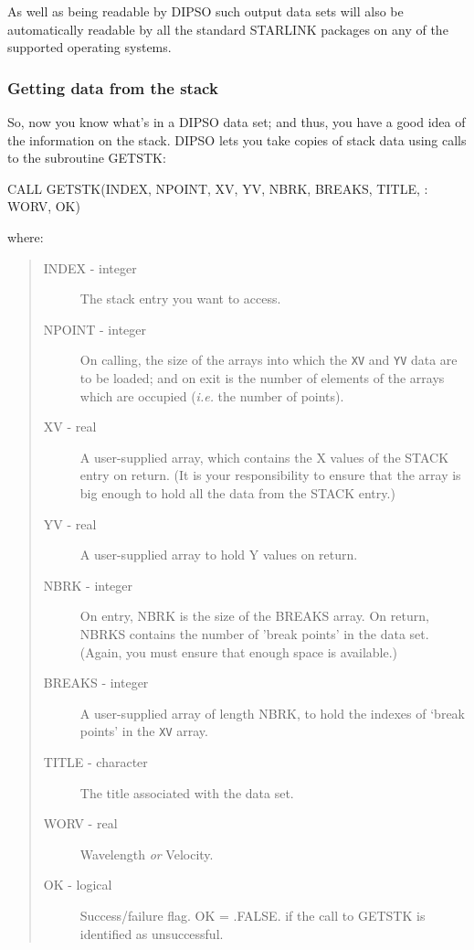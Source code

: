 \documentclass[twoside,11pt,noabs,nolof]{starlink}
\begin{document}
As well as being readable by DIPSO such output data sets will also be
automatically readable by all the standard STARLINK packages on any
of the supported operating systems.

\subsubsection {Getting data from the stack}

So, now you know what's in a DIPSO data set; and thus, you have a good
idea of the information on the stack. DIPSO lets you take copies of
stack data using calls to the subroutine GETSTK:

\begin{terminalv}
      CALL GETSTK(INDEX, NPOINT, XV, YV, NBRK, BREAKS, TITLE,
     :            WORV, OK)
\end{terminalv}

where:

\begin{quote}
\begin{description}

\item [INDEX - integer] The stack entry you want to access.

\item [NPOINT - integer] On calling, the size of the arrays into which the
{\texttt{XV}}  and {\texttt{YV}}  data are to be loaded; and on exit is the
number of elements of the arrays which are occupied (\emph{i.e.} the
number of points).

\item [XV - real] A user-supplied array, which contains the X values
of the STACK entry on return. (It is your responsibility to ensure
that the array is big enough to hold all the data from the STACK
entry.)

\item [YV - real] A user-supplied array to hold Y values on return.

\item [NBRK - integer] On entry, NBRK is the size of the BREAKS
array. On return, NBRKS contains the number of 'break points' in the
data set. (Again, you must ensure that enough space is available.)

\item [BREAKS - integer] A user-supplied array of length NBRK, to
hold the indexes of `break points' in the {\texttt{XV}}  array.

\item [TITLE - character] The title associated with the data set.

\item [WORV - real] Wavelength \emph{or} Velocity.

\item [OK - logical] Success/failure flag. OK = .FALSE. if the
call to GETSTK is identified as unsuccessful.

\end{description}
\end{quote}
\end{document}
